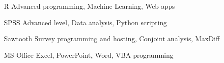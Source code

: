 


\begin{cvskills}

  \cvskill
    {R} %
    {Advanced programming, Machine Learning, Web apps} %

  \cvskill
    {SPSS} %
    {Advanced level, Data analysis, Python scripting} %

  \cvskill
    {Sawtooth} %
    {Survey programming and hosting, Conjoint analysis, MaxDiff} %

  \cvskill
    {MS Office} %
    {Excel, PowerPoint, Word, VBA programming} %

  \cvskill
    {} %
    {} %


\end{cvskills}